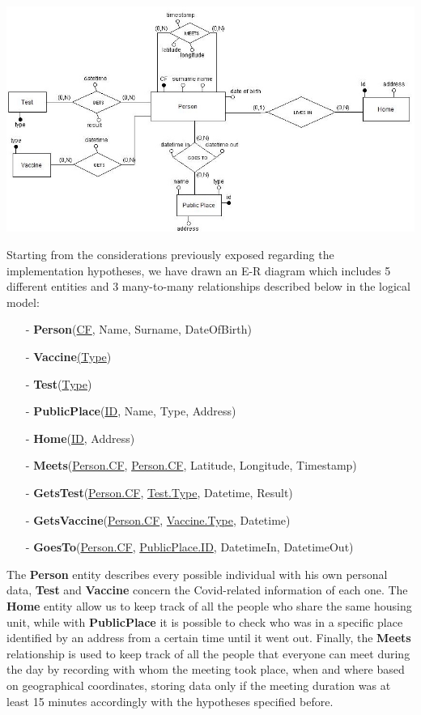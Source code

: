 \documentclass[a4paper,12pt]{article}
\begin{document}
\paragraph{}
	\begin{center}
 		\includegraphics[width = 10 cm]{ER_diagram.jpg}
	\end{center}
\par Starting from the considerations previously exposed regarding the implementation hypotheses, we have drawn an E-R diagram which includes 5 different entities and 3 many-to-many relationships described below in the logical model: \par
  \begin{itemize}[noitemsep]
   	\item[-]	\textbf{Person}(\underline{CF}, Name, Surname, DateOfBirth)
	\item[-]	\textbf{Vaccine}\underline{(Type})
	\item[-]	\textbf{Test}(\underline{Type})
	\item[-]	\textbf{PublicPlace}(\underline{ID}, Name, Type, Address)
	\item[-]	\textbf{Home}(\underline{ID}, Address)
	\item[-]	\textbf{Meets}(\underline{Person.CF}, \underline{Person.CF}, Latitude, Longitude, Timestamp)
	\item[-]	\textbf{GetsTest}(\underline{Person.CF}, \underline{Test.Type}, Datetime, Result)
	\item[-]	\textbf{GetsVaccine}(\underline{Person.CF}, \underline{Vaccine.Type}, Datetime)
	\item[-]	\textbf{GoesTo}(\underline{Person.CF}, \underline{PublicPlace.ID}, DatetimeIn, DatetimeOut)
  \end{itemize} \par
The \textbf{Person} entity describes every possible individual with his own personal data, \textbf{Test} and \textbf{Vaccine} concern the Covid-related information of each one. The \textbf{Home} entity allow us to keep track of all the people who share the same housing unit, while with \textbf{PublicPlace} it is possible to check who was in a specific place identified by an address from a certain time until it went out. Finally, the \textbf{Meets} relationship is used to keep track of all the people that everyone can meet during the day by recording with whom the meeting took place, when and where based on geographical coordinates, storing data only if the meeting duration was at least 15 minutes accordingly with the hypotheses specified before.
\end{document}
